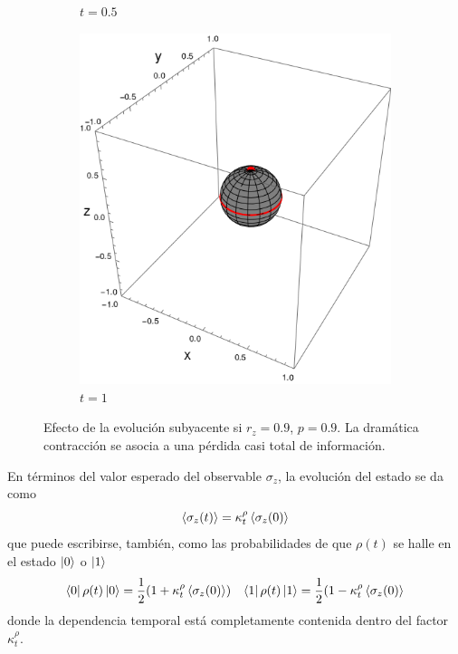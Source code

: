 \begin{figure}[h!]
\begin{subfigure}{0.32\textwidth}
    \caption{$t=0.5$}
  \end{subfigure}
  \begin{subfigure}{0.32\textwidth}
    \centering
    \includegraphics[width=0.9\linewidth]{maxent/figures/sphere_swapcontraction_t=1.0_z=0.9_p=0.9.png}
    \caption{$t=1$}
  \end{subfigure}
  \caption{Efecto de la evolución subyacente si $r_{z}=0.9$, $p=0.9$. La dramática contracción se asocia a una pérdida casi total de información.}
  \label{fig:SWAPFactorSequence}
  \end{figure}
En términos del valor esperado del observable $\sigma_{z}$, la evolución del estado se da como
\begin{equation}
  \expval{\sigma_{z}(t)}=\kappa_{t}^{\rho}\expval{\sigma_{z}(0)}
\end{equation}
que puede escribirse, también, como las probabilidades de que $\rho(t)$ se halle en el estado $\ket{0}$ o $\ket{1}$
 \begin{align}
  \bra{0}\rho(t)\ket{0}=\frac{1}{2}(1+\kappa_{t}^{\rho}\expval{\sigma_{z}(0)}) && \bra{1}\rho(t)\ket{1}=\frac{1}{2}(1-\kappa_{t}^{\rho}\expval{\sigma_{z}(0)}
 \end{align}
 donde la dependencia temporal está completamente contenida dentro del factor $\kappa_{t}^{\rho}$. 
\newpage